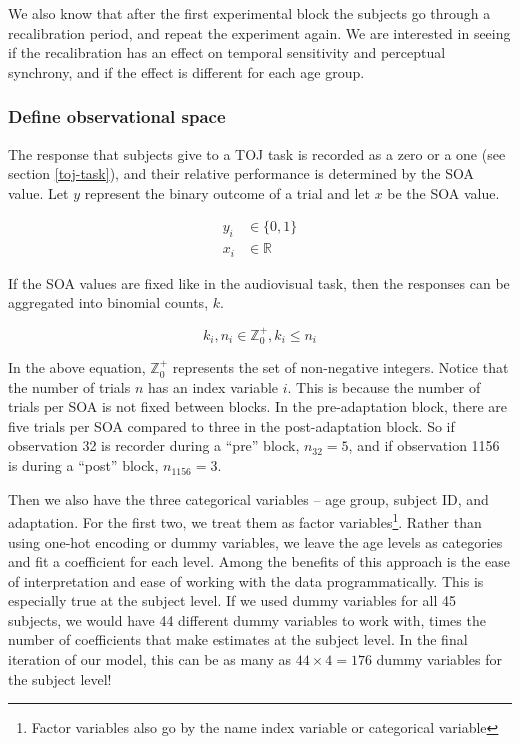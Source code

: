 \documentclass[11pt, oneside, openany]{scrbook}
\begin{document}
We also know that after the first experimental block the subjects go through a recalibration period, and repeat the experiment again. We are interested in seeing if the recalibration has an effect on temporal sensitivity and perceptual synchrony, and if the effect is different for each age group.

\hypertarget{iter1-obs-space}{%
\subsubsection{Define observational space}\label{iter1-obs-space}}

The response that subjects give to a TOJ task is recorded as a zero or a one (see section \ref{toj-task}), and their relative performance is determined by the SOA value. Let \(y\) represent the binary outcome of a trial and let \(x\) be the SOA value.

\begin{align*}
y_i &\in \lbrace 0, 1\rbrace \\
x_i &\in \mathbb{R}
\end{align*}

If the SOA values are fixed like in the audiovisual task, then the responses can be aggregated into binomial counts, \(k\).

\[
k_i, n_i \in \mathbb{Z}_0^+, k_i \le n_i
\]

In the above equation, \(\mathbb{Z}_0^+\) represents the set of non-negative integers. Notice that the number of trials \(n\) has an index variable \(i\). This is because the number of trials per SOA is not fixed between blocks. In the pre-adaptation block, there are five trials per SOA compared to three in the post-adaptation block. So if observation 32 is recorder during a ``pre'' block, \(n_{32} = 5\), and if observation 1156 is during a ``post'' block, \(n_{1156} = 3\).

Then we also have the three categorical variables -- age group, subject ID, and adaptation. For the first two, we treat them as factor variables\footnote{Factor variables also go by the name index variable or categorical variable}. Rather than using one-hot encoding or dummy variables, we leave the age levels as categories and fit a coefficient for each level. Among the benefits of this approach is the ease of interpretation and ease of working with the data programmatically. This is especially true at the subject level. If we used dummy variables for all 45 subjects, we would have 44 different dummy variables to work with, times the number of coefficients that make estimates at the subject level. In the final iteration of our model, this can be as many as \(44 \times 4 = 176\) dummy variables for the subject level!
\end{document}
